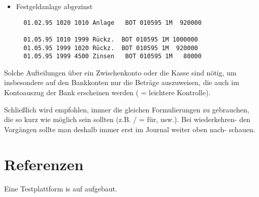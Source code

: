 \documentclass[12pt]{report}
\begin{document}
\begin{appendix}
\begin{itemize}
\item Festgeldanlage abgezinst
  \begin{verbatim}
  01.02.95 1020 1010 Anlage   BOT 010595 1M  920000

  01.05.95 1010 1999 Rückz.  BOT 010595 1M 1000000
  01.05.95 1999 1020 Rückz.  BOT 010595 1M  920000
  01.05.95 1999 4500 Zinsen   BOT 010595 1M   80000
  \end{verbatim}

\end{itemize}

Solche Aufteilungen über ein Zwischenkonto oder die Kasse sind nötig, um
insbesondere auf den Bankkonten nur die Beträge auszuweisen, die auch im
Kontoauszug der Bank erscheinen werden ( = leichtere Kontrolle).

Schließlich wird empfohlen, immer die gleichen Formulierungen zu gebrauchen,
die so kurz wie möglich sein sollten (z.B. / = für, usw.). Bei wiederkehren-
den Vorgängen sollte man deshalb immer erst im Journal weiter oben nach-
schauen.

\chapter{Referenzen}

Eine Testplattform is auf 
 aufgebaut.

\end{appendix}
\end{document}
